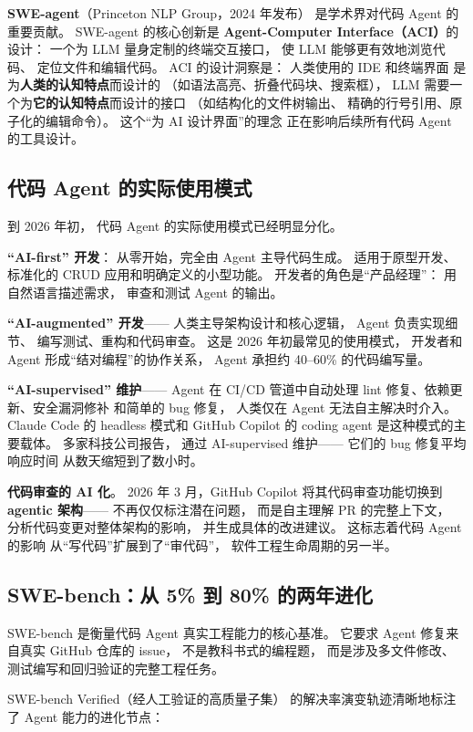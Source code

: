 \textbf{SWE-agent}（Princeton NLP Group，2024 年发布）
是学术界对代码 Agent 的重要贡献。
SWE-agent 的核心创新是
\textbf{Agent-Computer Interface（ACI）}的设计：
一个为 LLM 量身定制的终端交互接口，
使 LLM 能够更有效地浏览代码、
定位文件和编辑代码。
ACI 的设计洞察是：
人类使用的 IDE 和终端界面
是为\textbf{人类的认知特点}而设计的
（如语法高亮、折叠代码块、搜索框），
LLM 需要一个为\textbf{它的认知特点}而设计的接口
（如结构化的文件树输出、
精确的行号引用、原子化的编辑命令）。
这个“为 AI 设计界面”的理念
正在影响后续所有代码 Agent 的工具设计。

\subsection{代码 Agent 的实际使用模式}

到 2026 年初，
代码 Agent 的实际使用模式已经明显分化。

\textbf{“AI-first” 开发}：
从零开始，完全由 Agent 主导代码生成。
适用于原型开发、
标准化的 CRUD 应用和明确定义的小型功能。
开发者的角色是“产品经理”：
用自然语言描述需求，
审查和测试 Agent 的输出。

\textbf{“AI-augmented” 开发}——
人类主导架构设计和核心逻辑，
Agent 负责实现细节、
编写测试、重构和代码审查。
这是 2026 年初最常见的使用模式，
开发者和 Agent 形成“结对编程”的协作关系，
Agent 承担约 40--60\% 的代码编写量。

\textbf{“AI-supervised” 维护}——
Agent 在 CI/CD 管道中自动处理
lint 修复、依赖更新、安全漏洞修补
和简单的 bug 修复，
人类仅在 Agent 无法自主解决时介入。
Claude Code 的 headless 模式和
GitHub Copilot 的 coding agent
是这种模式的主要载体。
多家科技公司报告，
通过 AI-supervised 维护——
它们的 bug 修复平均响应时间
从数天缩短到了数小时。

\textbf{代码审查的 AI 化}。
2026 年 3 月，GitHub Copilot
将其代码审查功能切换到\textbf{agentic 架构}——
不再仅仅标注潜在问题，
而是自主理解 PR 的完整上下文，
分析代码变更对整体架构的影响，
并生成具体的改进建议。
这标志着代码 Agent 的影响
从“写代码”扩展到了“审代码”，
软件工程生命周期的另一半。

\subsection{SWE-bench：从 5\% 到 80\% 的两年进化}

SWE-bench 是衡量代码 Agent 真实工程能力的核心基准。
它要求 Agent 修复来自真实 GitHub 仓库的 issue，
不是教科书式的编程题，
而是涉及多文件修改、测试编写和回归验证的完整工程任务。

SWE-bench Verified（经人工验证的高质量子集）
的解决率演变轨迹清晰地标注了 Agent 能力的进化节点：

